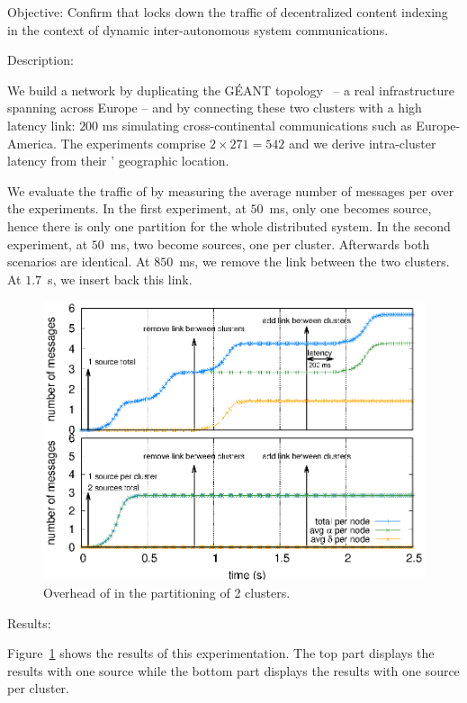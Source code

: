 \begin{asparadesc}

\item [Objective:] Confirm that \NAME locks down the traffic of decentralized content
  indexing in the context of dynamic inter-autonomous system
  communications.
  
\item [Description:]

We build a network by duplicating the G{\'E}ANT
topology~\cite{knight2011internet} -- a real infrastructure spanning
across Europe -- and by connecting these two clusters with a high
latency link: $200$ ms simulating cross-continental communications
such as Europe-America. The experiments comprise $2 \times 271 = 542$
\processes and we derive intra-cluster latency from their \processes'
geographic location.

\noindent We evaluate the traffic of \NAME by measuring the average
number of messages per \process over the experiments. In the first
experiment, at $50$~ms, only one \process becomes source, hence there
is only one partition for the whole distributed system. In the second
experiment, at $50$~ms, two \processes become sources, one per
cluster. Afterwards both scenarios are identical. At $850$~ms, we
remove the link between the two clusters. At $1.7$~s, we insert back this
link.

\begin{figure}
  \centering\includegraphics[width=0.65\columnwidth]{img/as_cast_geant.eps}
  \caption{\label{fig:geant}Overhead of \NAME in the partitioning of 2 clusters.}
\end{figure}

\item [Results:]

Figure~\ref{fig:geant} shows the results of this experimentation. The
top part displays the results with one source while the bottom part
displays the results with one source per cluster.


\end{asparadesc}
